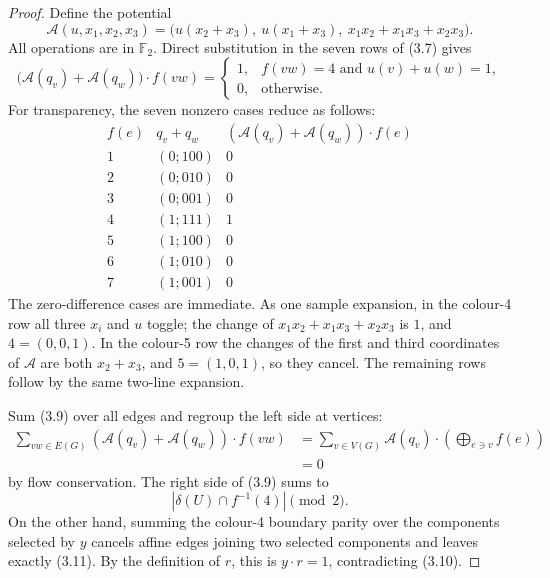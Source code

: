 \documentclass[11pt]{article}
\theoremstyle{definition}
\theoremstyle{remark}
\newcommand{\F}{\mathbb F}
\begin{document}
\begin{proof}
Define the potential
\[
 \mathcal A(u,x_1,x_2,x_3)=
 \bigl(
 u(x_2+x_3),\
 u(x_1+x_3),\
 x_1x_2+x_1x_3+x_2x_3
 \bigr).
                                                        \tag{3.8}
\]
All operations are in \(\F_2\).  Direct substitution in the seven
rows of (3.7) gives
\[
 \bigl(\mathcal A(q_v)+\mathcal A(q_w)\bigr)\cdot f(vw)
 =
 \begin{cases}
 1,&f(vw)=4\text{ and }u(v)+u(w)=1,\\
 0,&\text{otherwise}.
 \end{cases}                                            \tag{3.9}
\]
For transparency, the seven nonzero cases reduce as follows:
\[
\begin{array}{c|c|c}
f(e)&q_v+q_w&
(\mathcal A(q_v)+\mathcal A(q_w))\cdot f(e)\\ \hline
1&(0;100)&0\\
2&(0;010)&0\\
3&(0;001)&0\\
4&(1;111)&1\\
5&(1;100)&0\\
6&(1;010)&0\\
7&(1;001)&0
\end{array}
\]
The zero-difference cases are immediate.  As one sample expansion, in
the colour-4 row all three \(x_i\) and \(u\) toggle; the change of
\(x_1x_2+x_1x_3+x_2x_3\) is \(1\), and
\(4=(0,0,1)\).  In the colour-5 row the changes of the first and third
coordinates of \(\mathcal A\) are both \(x_2+x_3\), and
\(5=(1,0,1)\), so they cancel.  The remaining rows follow by the same
two-line expansion.

Sum (3.9) over all edges and regroup the left side at vertices:
\[
\begin{aligned}
\sum_{vw\in E(G)}
 (\mathcal A(q_v)+\mathcal A(q_w))\cdot f(vw)
 &=
\sum_{v\in V(G)}
 \mathcal A(q_v)\cdot
 \left(\bigoplus_{e\ni v}f(e)\right)\\
 &=0
\end{aligned}                                           \tag{3.10}
\]
by flow conservation.  The right side of (3.9) sums to
\[
                    |\delta(U)\cap f^{-1}(4)|\pmod2.
                                                        \tag{3.11}
\]
On the other hand, summing the colour-4 boundary parity over the
components selected by \(y\) cancels affine edges joining two selected
components and leaves exactly (3.11).  By the definition of \(r\), this
is \(y\cdot r=1\), contradicting (3.10).
\end{proof}
\end{document}
